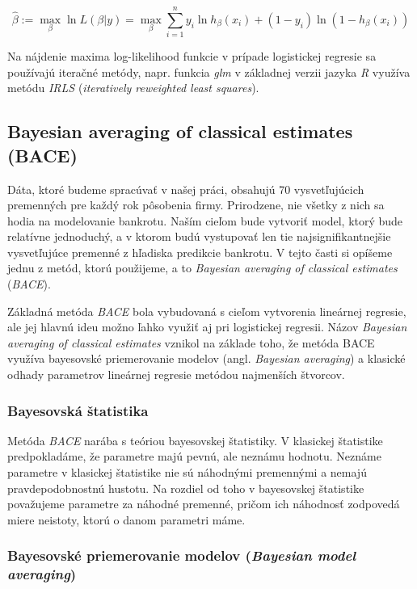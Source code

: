 \[
\hat{\beta} := \max_{\beta} \ln L(\beta | y) = \max_{\beta} \sum_{i = 1}^n y_i \ln{h_{\beta}(x_i)} + (1 - y_i) \ln{(1 - h_{\beta}(x_i))}
\]

Na nájdenie maxima log-likelihood funkcie v prípade logistickej regresie sa používajú iteračné metódy,
napr. funkcia \emph{glm} v základnej verzii jazyka \emph{R} využíva metódu \emph{IRLS} (\emph{iteratively reweighted least squares}).

\subsection{Bayesian averaging of classical estimates (BACE)}

Dáta, ktoré budeme spracúvať v našej práci, obsahujú 70 vysvetľujúcich premenných pre každý rok pôsobenia firmy.
Prirodzene, nie všetky z nich sa hodia na modelovanie bankrotu.
Naším cieľom bude vytvoriť model, ktorý bude relatívne jednoduchý, a v ktorom budú vystupovať len tie najsignifikantnejšie vysvetľujúce premenné z hľadiska predikcie bankrotu.
V tejto časti si opíšeme jednu z metód, ktorú použijeme, a to \emph{Bayesian averaging of classical estimates} (\emph{BACE}).

Základná metóda \emph{BACE} bola vybudovaná s cieľom vytvorenia lineárnej regresie, ale jej hlavnú ideu možno ľahko využiť aj pri logistickej regresii.
Názov \emph{Bayesian averaging of classical estimates} vznikol na základe toho, že metóda BACE využíva bayesovské priemerovanie modelov (angl. \emph{Bayesian averaging}) a klasické odhady parametrov lineárnej regresie metódou najmenších štvorcov.

\subsubsection{Bayesovská štatistika}

Metóda \emph{BACE} narába s teóriou bayesovskej štatistiky.
V klasickej štatistike predpokladáme, že parametre majú pevnú, ale neznámu hodnotu.
Neznáme parametre v klasickej štatistike nie sú náhodnými premennými a nemajú pravdepodobnostnú hustotu.
Na rozdiel od toho v bayesovskej štatistike považujeme parametre za náhodné premenné, pričom ich náhodnosť zodpovedá miere neistoty, ktorú o danom parametri máme.

\subsubsection{Bayesovské priemerovanie modelov (\emph{Bayesian model averaging})}

